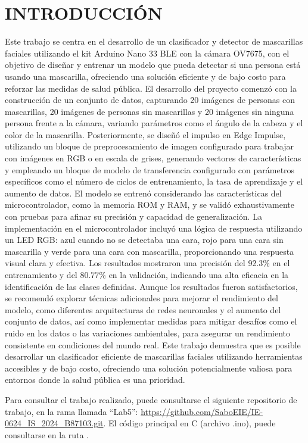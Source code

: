 \newpage
\section{INTRODUCCIÓN}
 Este trabajo se centra en el desarrollo de un clasificador y detector de mascarillas faciales utilizando el kit Arduino Nano 33 BLE con la cámara OV7675, con el objetivo de diseñar y entrenar un modelo que pueda detectar si una persona está usando una mascarilla, ofreciendo una solución eficiente y de bajo costo para reforzar las medidas de salud pública. El desarrollo del proyecto comenzó con la construcción de un conjunto de datos, capturando 20 imágenes de personas con mascarillas, 20 imágenes de personas sin mascarillas y 20 imágenes sin ninguna persona frente a la cámara, variando parámetros como el ángulo de la cabeza y el color de la mascarilla. Posteriormente, se diseñó el impulso en Edge Impulse, utilizando un bloque de preprocesamiento de imagen configurado para trabajar con imágenes en RGB o en escala de grises, generando vectores de características y empleando un bloque de modelo de transferencia configurado con parámetros específicos como el número de ciclos de entrenamiento, la tasa de aprendizaje y el aumento de datos. El modelo se entrenó considerando las características del microcontrolador, como la memoria ROM y RAM, y se validó exhaustivamente con pruebas para afinar su precisión y capacidad de generalización. La implementación en el microcontrolador incluyó una lógica de respuesta utilizando un LED RGB: azul cuando no se detectaba una cara, rojo para una cara sin mascarilla y verde para una cara con mascarilla, proporcionando una respuesta visual clara y efectiva. Los resultados mostraron una precisión del 92.3\% en el entrenamiento y del 80.77\% en la validación, indicando una alta eficacia en la identificación de las clases definidas. Aunque los resultados fueron satisfactorios, se recomendó explorar técnicas adicionales para mejorar el rendimiento del modelo, como diferentes arquitecturas de redes neuronales y el aumento del conjunto de datos, así como implementar medidas para mitigar desafíos como el ruido en los datos o las variaciones ambientales, para asegurar un rendimiento consistente en condiciones del mundo real. Este trabajo demuestra que es posible desarrollar un clasificador eficiente de mascarillas faciales utilizando herramientas accesibles y de bajo costo, ofreciendo una solución potencialmente valiosa para entornos donde la salud pública es una prioridad.


Para consultar el trabajo realizado, puede consultarse el siguiente repositorio de trabajo, en la rama llamada ``Lab5'': \url{https://github.com/SaboEIE/IE-0624_IS_2024_B87103.git}. El código principal en C (archivo .ino), puede consultarse en la ruta . 
 